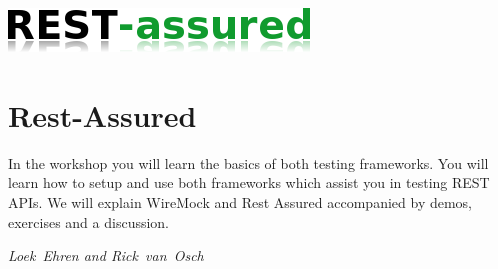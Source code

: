 \hfill\includegraphics[width=.5\linewidth]{images/restassured.png}

\section{Rest-Assured}
In the workshop you will learn the basics of both testing
frameworks. You will learn how to setup and use both frameworks which
assist you in testing REST APIs. We will explain WireMock and Rest
Assured accompanied by demos, exercises and a discussion.

\hfill\textit{Loek~Ehren and Rick~van~Osch}
